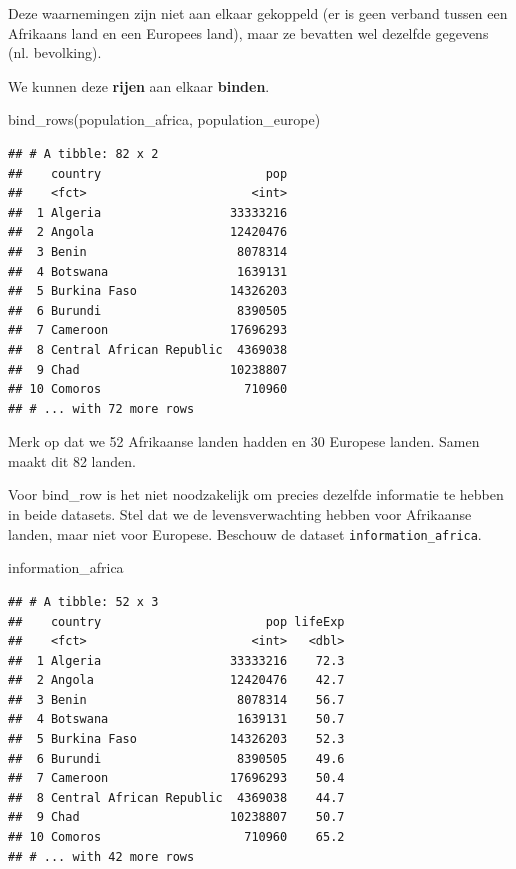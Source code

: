 \documentclass[]{tufte-book}
\newenvironment{Shaded}{}{}
\newcommand{\FunctionTok}[1]{\textcolor[rgb]{0.02,0.16,0.49}{#1}}
\newcommand{\NormalTok}[1]{#1}
\begin{document}
Deze waarnemingen zijn niet aan elkaar gekoppeld (er is geen verband tussen een Afrikaans land en een Europees land), maar ze bevatten wel dezelfde gegevens (nl. bevolking).

We kunnen deze \textbf{rijen} aan elkaar \textbf{binden}.

\begin{Shaded}
\begin{Highlighting}[]
\FunctionTok{bind\_rows}\NormalTok{(population\_africa, population\_europe)}
\end{Highlighting}
\end{Shaded}

\begin{verbatim}
## # A tibble: 82 x 2
##    country                       pop
##    <fct>                       <int>
##  1 Algeria                  33333216
##  2 Angola                   12420476
##  3 Benin                     8078314
##  4 Botswana                  1639131
##  5 Burkina Faso             14326203
##  6 Burundi                   8390505
##  7 Cameroon                 17696293
##  8 Central African Republic  4369038
##  9 Chad                     10238807
## 10 Comoros                    710960
## # ... with 72 more rows
\end{verbatim}

Merk op dat we 52 Afrikaanse landen hadden en 30 Europese landen. Samen maakt dit 82 landen.

Voor bind\_row is het niet noodzakelijk om precies dezelfde informatie te hebben in beide datasets. Stel dat we de levensverwachting hebben voor Afrikaanse landen, maar niet voor Europese. Beschouw de dataset \texttt{information\_africa}.

\begin{Shaded}
\begin{Highlighting}[]
\NormalTok{information\_africa}
\end{Highlighting}
\end{Shaded}

\begin{verbatim}
## # A tibble: 52 x 3
##    country                       pop lifeExp
##    <fct>                       <int>   <dbl>
##  1 Algeria                  33333216    72.3
##  2 Angola                   12420476    42.7
##  3 Benin                     8078314    56.7
##  4 Botswana                  1639131    50.7
##  5 Burkina Faso             14326203    52.3
##  6 Burundi                   8390505    49.6
##  7 Cameroon                 17696293    50.4
##  8 Central African Republic  4369038    44.7
##  9 Chad                     10238807    50.7
## 10 Comoros                    710960    65.2
## # ... with 42 more rows
\end{verbatim}
\end{document}
